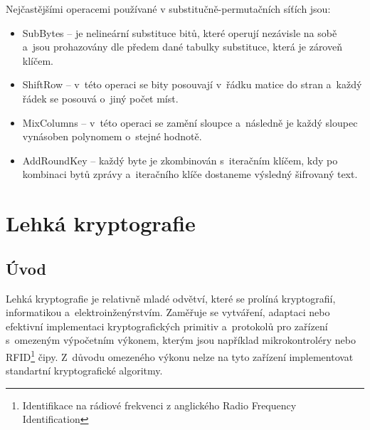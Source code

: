Nejčastějšími operacemi používané v substitučně-permutačních síťích jsou:
\begin{itemize}
    \item SubBytes -- je nelineární substituce bitů, které operují nezávisle na sobě a~jsou prohazovány dle předem dané tabulky substituce, která je zároveň klíčem. 
    \item ShiftRow -- v~této operaci se bity posouvají v~řádku matice do stran a~každý řádek se posouvá o~jiný počet míst.
    \item MixColumns -- v~této operaci se zamění sloupce a~následně je každý sloupec vynásoben polynomem o~stejné hodnotě.
    \item AddRoundKey -- každý byte je zkombinován s~iteračním klíčem, kdy po kombinaci bytů zprávy a~iteračního klíče dostaneme výsledný šifrovaný text. 
\end{itemize}%
\null
\vfill

\chapter{Lehká kryptografie}
\section{Úvod}
Lehká kryptografie je relativně mladé odvětví, které se prolíná kryptografií, informatikou  a~elektroinženýrstvím. Zaměřuje se vytváření, adaptaci nebo efektivní implementaci kryptografických primitiv a~protokolů pro zařízení s~omezeným výpočetním výkonem, kterým jsou například mikrokontroléry nebo RFID\footnote{Identifikace na rádiové frekvenci z anglického Radio Frequency Identification} čipy. Z~důvodu omezeného výkonu nelze na tyto zařízení implementovat standartní kryptografické algoritmy.\cite{PoschmannCrypto}

